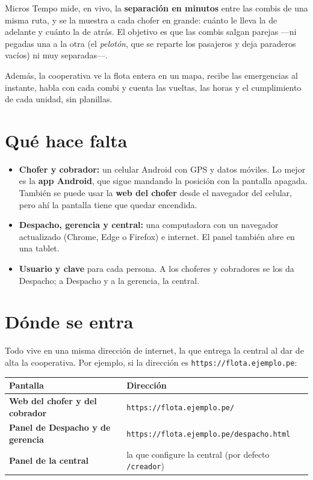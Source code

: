 \documentclass[11pt,a4paper,oneside]{book}
\begin{document}
Micros Tempo mide, en vivo, la \textbf{separación en minutos} entre las combis
de una misma ruta, y se la muestra a cada chofer en grande: cuánto le lleva la
de adelante y cuánto la de atrás. El objetivo es que las combis salgan
parejas —ni pegadas una a la otra (el \emph{pelotón}, que se reparte los
pasajeros y deja paraderos vacíos) ni muy separadas—.

Además, la cooperativa ve la flota entera en un mapa, recibe las emergencias
al instante, habla con cada combi y cuenta las vueltas, las horas y el
cumplimiento de cada unidad, sin planillas.

\section{Qué hace falta}

\begin{itemize}
  \item \textbf{Chofer y cobrador:} un celular Android con GPS y datos móviles.
    Lo mejor es la \textbf{app Android}, que sigue mandando la posición con la
    pantalla apagada. También se puede usar la \textbf{web del chofer} desde el
    navegador del celular, pero ahí la pantalla tiene que quedar encendida.
  \item \textbf{Despacho, gerencia y central:} una computadora con un navegador
    actualizado (Chrome, Edge o Firefox) e internet. El panel también abre en
    una tablet.
  \item \textbf{Usuario y clave} para cada persona. A los choferes y cobradores
    se los da Despacho; a Despacho y a la gerencia, la central.
\end{itemize}

\section{Dónde se entra}

Todo vive en una misma dirección de internet, la que entrega la central al dar
de alta la cooperativa. Por ejemplo, si la dirección es
\texttt{https://flota.ejemplo.pe}:

\begin{center}
\renewcommand{\arraystretch}{1.3}
\begin{tabular}{>{\bfseries}l l}
\toprule
\rowcolor{fondo} Pantalla & Dirección \\
\midrule
Web del chofer y del cobrador & \texttt{https://flota.ejemplo.pe/} \\
Panel de Despacho y de gerencia & \texttt{https://flota.ejemplo.pe/despacho.html} \\
Panel de la central & la que configure la central (por defecto \texttt{/creador}) \\
\bottomrule
\end{tabular}
\end{center}
\end{document}
